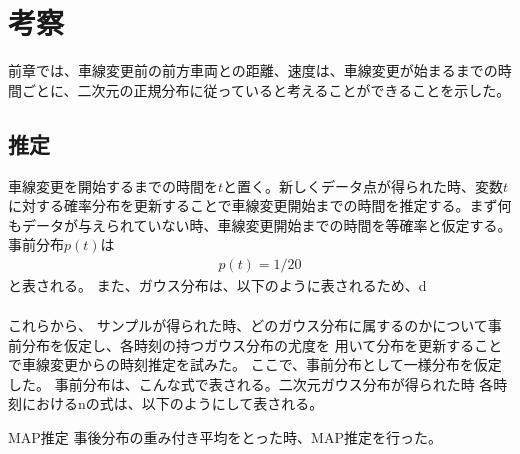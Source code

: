 \chapter{考察}
前章では、車線変更前の前方車両との距離、速度は、車線変更が始まるまでの時間ごとに、二次元の正規分布に従っていると考えることができることを示した。
\section{推定}
車線変更を開始するまでの時間を$t$と置く。新しくデータ点が得られた時、変数$t$に対する確率分布を更新することで車線変更開始までの時間を推定する。まず何もデータが与えられていない時、車線変更開始までの時間を等確率と仮定する。事前分布$p(t)$は
\begin{align}
p(t)=1/20
\end{align}
と表される。
また、ガウス分布は、以下のように表されるため、d
\begin{align}

\end{align}

これらから、
サンプルが得られた時、どのガウス分布に属するのかについて事前分布を仮定し、各時刻の持つガウス分布の尤度を
用いて分布を更新することで車線変更からの時刻推定を試みた。
ここで、事前分布として一様分布を仮定した。
事前分布は、こんな式で表される。二次元ガウス分布が得られた時
各時刻におけるnの式は、以下のようにして表される。

MAP推定
事後分布の重み付き平均をとった時、MAP推定を行った。
